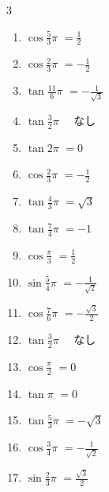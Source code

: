 \begin{multicols}{3}
\begin{enumerate}
  \item $\displaystyle \cos{\frac{5}{3}\pi}$
        $\displaystyle =\frac{1}{2}$

  \item $\displaystyle \cos{\frac{2}{3}\pi}$
        $\displaystyle =-\frac{1}{2}$

  \item $\displaystyle \tan{\frac{11}{6}\pi}$
        $\displaystyle =-\frac{1}{\sqrt{3}}$

  \item $\displaystyle \tan{\frac{3}{2}\pi}$
        $\displaystyle \quad なし$

  \item $\displaystyle \tan{2\pi}$
        $\displaystyle =0$

  \item $\displaystyle \cos{\frac{2}{3}\pi}$
        $\displaystyle =-\frac{1}{2}$

  \item $\displaystyle \tan{\frac{4}{3}\pi}$
        $\displaystyle =\sqrt{3}$

  \item $\displaystyle \tan{\frac{7}{4}\pi}$
        $\displaystyle =-1$

  \item $\displaystyle \cos{\frac{\pi}{3}}$
        $\displaystyle =\frac{1}{2}$

  \item $\displaystyle \sin{\frac{5}{4}\pi}$
        $\displaystyle =-\frac{1}{\sqrt{2}}$

  \item $\displaystyle \cos{\frac{7}{6}\pi}$
        $\displaystyle =-\frac{\sqrt{3}}{2}$

  \item $\displaystyle \tan{\frac{3}{2}\pi}$
        $\displaystyle \quad なし$

  \item $\displaystyle \cos{\frac{\pi}{2}}$
        $\displaystyle =0$

  \item $\displaystyle \tan{\pi}$
        $\displaystyle =0$

  \item $\displaystyle \tan{\frac{5}{3}\pi}$
        $\displaystyle =-\sqrt{3}$

  \item $\displaystyle \cos{\frac{3}{4}\pi}$
        $\displaystyle =-\frac{1}{\sqrt{2}}$

  \item $\displaystyle \sin{\frac{2}{3}\pi}$
        $\displaystyle =\frac{\sqrt{3}}{2}$


\end{enumerate}
\end{multicols}
